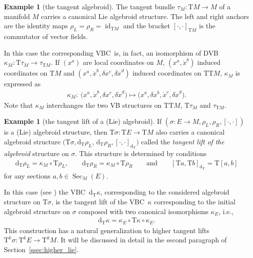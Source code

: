 \documentclass[10pt,a4paper]{amsart}
\newcommand{\ZM}{{VBC}} %
\newcommand{\Sec}{\operatorname{Sec}}
\newcommand{\id}{\operatorname{id}}
\newcommand{\dd}{\mathrm{d}}
\newcommand{\ra}{\rightarrow}
\newcommand{\rhoL}{\rho_L} %
\newcommand{\rhoR}{\rho_R}
\newcommand{\T}{\mathrm{T}} %
\newcommand{\TT}[1]{\mathrm{T}^{#1}} %
\numberwithin{equation}{section}
\theoremstyle{definition}
\newtheorem{ex}[thm]{Example}
\begin{document}
\begin{ex}[the tangent algebroid] \label{ex:tang_alg}The tangent bundle $\tau_M\colon \T M \ra M$ of a manifold $M$ carries a canonical Lie algebroid structure. The left and right anchors are the identity maps $\rhoL=\rhoR=\id_{\T M}$ and the bracket $[\cdot,\cdot]_{\T M}$ is the commutator of vector fields.

In this case the corresponding \ZM\ is, in fact, an isomorphism of DVB $\kappa_M\colon \T\tau_M\ra \tau_{\T M}$. If $(x^a)$ are local coordinates on $M$, $(x^a, \dot x^b)$ induced coordinates on $\T M$ and $(x^a, \dot x^b, \delta x^c,\delta\dot x^d)$ induced coordinates on $\T\T M$, $\kappa_M$ is expressed as
\begin{gather*} \kappa_M\colon \ \big(x^a, \dot x^b, \delta x^c,\delta\dot x^d\big)\longmapsto \big(x^a, \delta x^b, \dot x^c,\delta\dot x^d\big).\end{gather*}
Note that $\kappa_M$ interchanges the two VB structures on $\T \T M$, $\T\tau_M$ and $\tau_{\T M}$.
\end{ex}

\begin{ex}[the tangent lift of a (Lie) algebroid]\label{ex:tang_lift} If $(\sigma\colon E\ra M, \rhoL,\rhoR,[\cdot,\cdot])$ is a (Lie) algebroid structure, then $\T\sigma\colon \T E\ra \T M$ also carries a canonical algebroid structure $(\T\sigma, \dd_\T\rhoL$, $\dd_\T\rhoR, [\cdot,\cdot]_{\dd_\T})$ called the \emph{tangent lift of the algebroid} structure on $\sigma$. This structure is determined by conditions{\samepage
\begin{gather*} \dd_\T\rhoL=\kappa_M\circ \T\rhoL,\qquad \dd_\T\rhoR=\kappa_M\circ \T\rhoR\qquad\text{and}\qquad [\T a,\T b]_{\dd_\T}=\T[a,b] \end{gather*}
for any sections $a,b\in\Sec_M(E)$.}

In this case (see \cite{JG_PU_Algebroids_1999}) the \ZM\ $\dd_\T\kappa$, corresponding to the considered algebroid structure on $\T\sigma$, is the tangent lift of the \ZM\ $\kappa$ corresponding to the initial algebroid structure on $\sigma$ composed with two canonical isomorphisms $\kappa_E$, i.e.,
\begin{gather*}\dd_\T\kappa=\kappa_E\circ\T \kappa \circ\kappa_E.\end{gather*}
 This construction has a natural generalization to higher tangent lifts $\TT{k}\sigma\colon \TT{k} E\ra\TT{k} M$. It will be discussed in detail in the second paragraph of Section~\ref{ssec:higher_lie}.
\end{ex}
\end{document}
